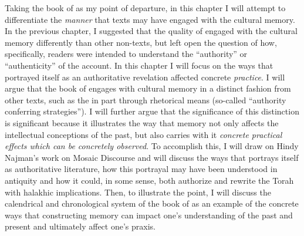 Taking the book of \jub as my point of departure, in this chapter I will attempt to differentiate the \emph{manner} that \rwb texts may have engaged with the cultural memory. In the previous chapter, I suggested that the \psgraphical quality of \ga engaged with the cultural memory differently than other non-\psgraphical texts, but left open the question of how, specifically, readers were intended to understand the ``authority'' or ``authenticity'' of the account. In this chapter I will focus on the ways that \jub portrayed itself as an authoritative revelation affected concrete \emph{practice}. I will argue that the book of \jub engages with cultural memory in a distinct fashion from other texts, such as the \ga in part through rhetorical means (so-called ``authority conferring strategies''). I will further argue that the significance of this distinction is significant because it illustrates the way that memory not only affects the intellectual conceptions of the past, but also carries with it \emph{concrete practical effects which can be concretely observed}. To accomplish this, I will draw on Hindy Najman's work on Mosaic Discourse and will discuss the ways that \jub portrays itself as authoritative literature, how this portrayal may have been understood in antiquity and how it could, in some sense, both authorize and rewrite the Torah with halakhic implications. Then, to illustrate the point, I will discuss the calendrical and chronological system of the book of \jub as an example of the concrete ways that constructing memory can impact one's understanding of the past and present and ultimately affect one's praxis.
